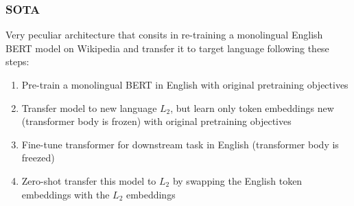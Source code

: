 






\subsubsection{SOTA}

Very peculiar architecture that consits in re-training a monolingual English BERT model on
Wikipedia and transfer it to target language following these steps:

\begin{enumerate}
    \item Pre-train a monolingual BERT in English with original pretraining objectives
    \item Transfer model to new language $L_2$, but learn only token embeddings new (transformer body is frozen) with original pretraining objectives
    \item Fine-tune transformer for downstream task in English (transformer body is freezed)
    \item Zero-shot transfer this model to $L_2$ by swapping the English token embeddings with the $L_2$ embeddings
\end{enumerate}

